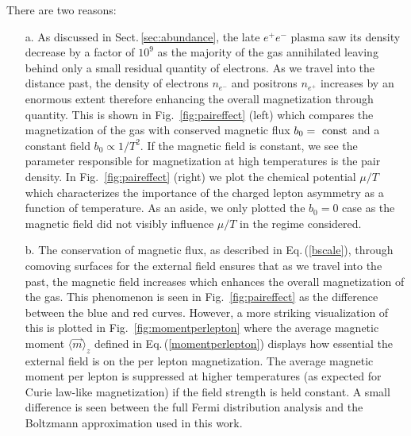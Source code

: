 \documentclass[a4paper]{article}
\newcommand{\req}[1]{Eq.\,(\ref{#1})}
\newcommand{\rf}[1]{Fig.~{\ref{#1}}}
\newcommand{\rsec}[1]{Sect.\,{\ref{#1}}}
\begin{document}
There are two reasons:
\begin{itemize}
    \item[a.] As discussed in \rsec{sec:abundance}, the late $e^{+}e^{-}$ plasma saw its density decrease by a factor of $10^{9}$ as the majority of the gas annihilated leaving behind only a small residual quantity of electrons. As we travel into the distance past, the density of electrons $n_{e^{-}}$ and positrons $n_{e^{+}}$ increases by an enormous extent therefore enhancing the overall magnetization through quantity. This is shown in \rf{fig:paireffect} (left) which compares the magnetization of the gas with conserved magnetic flux $b_{0}={\rm\ const}$ and a constant field $b_{0}\propto1/T^{2}$. If the magnetic field is constant, we see the parameter responsible for magnetization at high temperatures is the pair density. In \rf{fig:paireffect} (right) we plot the chemical potential $\mu/T$ which characterizes the importance of the charged lepton asymmetry as a function of temperature. As an aside, we only plotted the $b_{0}=0$ case as the magnetic field did not visibly influence $\mu/T$ in the regime considered.
    \item[b.] The conservation of magnetic flux, as described in \req{bscale}, through comoving surfaces for the external field ensures that as we travel into the past, the magnetic field increases which enhances the overall magnetization of the gas. This phenomenon is seen in \rf{fig:paireffect} as the difference between the blue and red curves. However, a more striking visualization of this is plotted in \rf{fig:momentperlepton} where the average magnetic moment $\langle\vec{m}\rangle_{z}$ defined in \req{momentperlepton} displays how essential the external field is on the per lepton magnetization. The average magnetic moment per lepton is suppressed at higher temperatures (as expected for Curie law-like magnetization) if the field strength is held constant. A small difference is seen between the full Fermi distribution analysis and the Boltzmann approximation used in this work.
\end{itemize}

\end{document}
